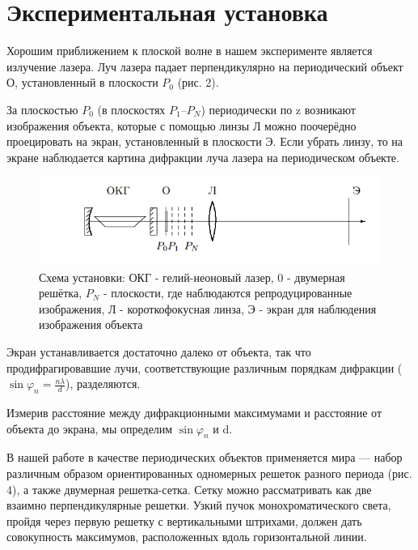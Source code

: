 \documentclass[a4paper,12pt]{article}
\begin{document}
\section{Экспериментальная установка}
Хорошим приближением к плоской волне в нашем эксперименте является излучение лазера. Луч лазера падает перпендикулярно на периодический объект О, установленный в плоскости $P_0$ (рис. 2).

За плоскостью $P_0$ (в плоскостях $P_1$–$P_N$) периодически по z возникают изображения объекта, которые с помощью линзы Л можно поочерёдно проецировать на экран, установленный в плоскости Э. Если убрать линзу, то на экране наблюдается картина дифракции луча лазера на периодическом объекте.

\begin{figure}[H]
\includegraphics[scale=1]{scheme2.png}
\caption{Схема установки: ОКГ - гелий-неоновый лазер, 0 - двумерная решётка, $P_N$ - плоскости, где наблюдаются репродуцированные изображения, Л - короткофокусная линза, Э - экран для наблюдения изображения объекта}
\end{figure}

Экран устанавливается достаточно далеко от объекта, так что продифрагировавшие лучи, соответствующие различным порядкам дифракции ($\sin \varphi_n = \frac{n\lambda}{d}$), разделяются. 

Измерив расстояние между дифракционными максимумами и расстояние от объекта до экрана, мы определим $\sin \varphi_n$ и d.

В нашей работе в качестве периодических объектов применяется мира — набор различным образом ориентированных одномерных решеток разного периода (рис. 4), а
также двумерная решетка-сетка. Сетку можно рассматривать как две взаимно перпендикулярные решетки. Узкий пучок монохроматического света, пройдя через первую решетку с вертикальными штрихами, должен дать совокупность максимумов, расположенных вдоль горизонтальной линии.
\end{document}
